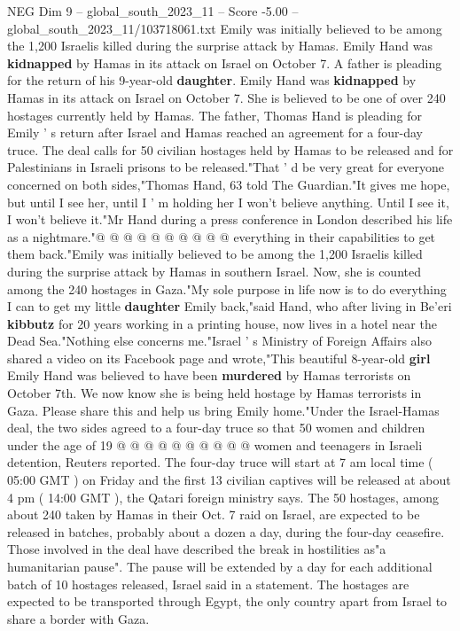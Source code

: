 \begin{textsample}{NEG Dim 9 – global\_south\_2023\_11 – Score -5.00 – global\_south\_2023\_11/103718061.txt}  \label{ex:f9_neg_320}
Emily was initially believed to be among the 1,200 Israelis killed during the surprise attack by Hamas.
Emily Hand was \textbf{kidnapped} by Hamas in its attack on Israel on October 7.
A father is pleading for the return of his 9-year-old \textbf{daughter}.
Emily Hand was \textbf{kidnapped} by Hamas in its attack on Israel on October 7.
She is believed to be one of over 240 hostages currently held by Hamas.
The father, Thomas Hand is pleading for Emily ' s return after Israel and Hamas reached an agreement for a four-day truce.
The deal calls for 50 civilian hostages held by Hamas to be released and for Palestinians in Israeli prisons to be released."That ' d be very great for everyone concerned on both sides,"Thomas Hand, 63 told The Guardian."It gives me hope, but until I see her, until I ' m holding her I won't believe anything.
Until I see it, I won't believe it."Mr Hand during a press conference in London described his life as a nightmare."@ @ @ @ @ @ @ @ @ @ everything in their capabilities to get them back."Emily was initially believed to be among the 1,200 Israelis killed during the surprise attack by Hamas in southern Israel.
Now, she is counted among the 240 hostages in Gaza."My sole purpose in life now is to do everything I can to get my little \textbf{daughter} Emily back,"said Hand, who after living in Be'eri \textbf{kibbutz} for 20 years working in a printing house, now lives in a hotel near the Dead Sea."Nothing else concerns me."Israel ' s Ministry of Foreign Affairs also shared a video on its Facebook page and wrote,"This beautiful 8-year-old \textbf{girl} Emily Hand was believed to have been \textbf{murdered} by Hamas terrorists on October 7th.
We now know she is being held hostage by Hamas terrorists in Gaza.
Please share this and help us bring Emily home."Under the Israel-Hamas deal, the two sides agreed to a four-day truce so that 50 women and children under the age of 19 @ @ @ @ @ @ @ @ @ @ women and teenagers in Israeli detention, Reuters reported.
The four-day truce will start at 7 am local time ( 05:00 GMT ) on Friday and the first 13 civilian captives will be released at about 4 pm ( 14:00 GMT ), the Qatari foreign ministry says.
The 50 hostages, among about 240 taken by Hamas in their Oct. 7 raid on Israel, are expected to be released in batches, probably about a dozen a day, during the four-day ceasefire.
Those involved in the deal have described the break in hostilities as"a humanitarian pause".
The pause will be extended by a day for each additional batch of 10 hostages released, Israel said in a statement.
The hostages are expected to be transported through Egypt, the only country apart from Israel to share a border with Gaza.

\end{textsample}
